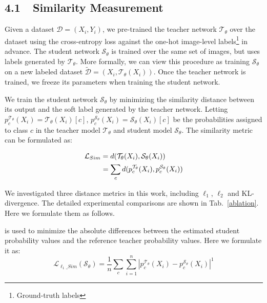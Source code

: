 \documentclass[letterpaper]{article} %
\newcommand{\LL}{\mathcal{L}}
\begin{document}
\subsection{4.1~~Similarity Measurement}
Given a dataset $\mathcal{D}={(X_i, Y_i)}$, we pre-trained the teacher network $\mathcal{T}_\theta$ over the dataset using the cross-entropy loss against the one-hot image-level labels{\footnote{Ground-truth labels}} in advance. The student network $\mathcal{S}_\theta$ is trained over the same set of images, but uses labels generated by $\mathcal{T}_\theta$. More formally, we can view this procedure as training $\mathcal{S}_\theta$ on a new labeled dataset $\tilde{\mathcal{D}}={(X_i, \mathcal{T}_\theta(X_i))}$. Once the teacher network is trained, we freeze its parameters when training the student network. 

We train the student network $\mathcal{S}_\theta$ by minimizing the similarity distance between its output and the soft label generated by the teacher network. Letting $p_c^{{\mathcal T}_\theta}({X_i})={\mathcal{T}_\theta }({X_i})[c]$, $p_c^{{\mathcal S}_\theta}({X_i})={\mathcal{S}_\theta }({X_i})[c]$ be the probabilities assigned to class $c$ in the teacher model $\mathcal T_\theta$ and student model $\mathcal S_\theta$. The similarity metric can be formulated as:

\begin{equation}
\begin{gathered}
\LL_{Sim} = d({\mathcal{T}_\theta }({X_i}),{\mathcal{S}_\theta }({X_i})) \hfill \\
\quad \quad \;\; = \sum\limits_c {d(p_c^{\mathcal{T}_\theta}({X_i}),p_c^{\mathcal{S}_\theta}({X_i}))}  \hfill \\ 
\end{gathered} 
\end{equation}

We investigated three distance metrics in this work, including $\ell_1$, $\ell_2$ and KL-divergence. The detailed experimental comparisons are shown in Tab.~\ref{ablation}. Here we formulate them as follows.

 is used to minimize the absolute differences between the estimated student probability values and the reference teacher probability values. Here we formulate it as:
\begin{equation}
\LL_{\ell_1\_Sim}({\mathcal{S}_\theta }) = \frac{1}{n}\sum\limits_c {\sum\limits_{i = 1}^n {{{\left| {p_c^{\mathcal{T}_\theta }({X_i}) - p_c^{\mathcal{S}_\theta }({X_i})} \right|}^1}} } 
\end{equation}
\end{document}
